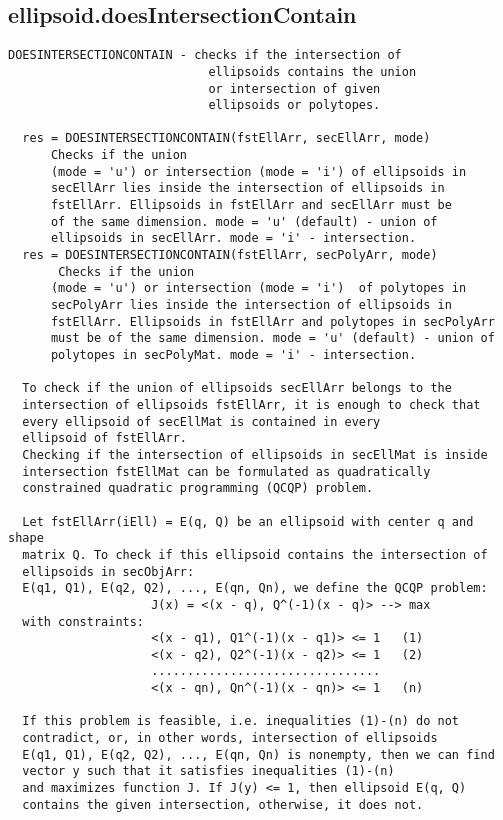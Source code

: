 \subsection{\texorpdfstring{ellipsoid.doesIntersectionContain}{doesIntersectionContain}}\label{method:ellipsoid.doesIntersectionContain}
\begin{verbatim}
DOESINTERSECTIONCONTAIN - checks if the intersection of
                            ellipsoids contains the union
                            or intersection of given
                            ellipsoids or polytopes.

  res = DOESINTERSECTIONCONTAIN(fstEllArr, secEllArr, mode)
      Checks if the union
      (mode = 'u') or intersection (mode = 'i') of ellipsoids in
      secEllArr lies inside the intersection of ellipsoids in
      fstEllArr. Ellipsoids in fstEllArr and secEllArr must be
      of the same dimension. mode = 'u' (default) - union of
      ellipsoids in secEllArr. mode = 'i' - intersection.
  res = DOESINTERSECTIONCONTAIN(fstEllArr, secPolyArr, mode)
       Checks if the union
      (mode = 'u') or intersection (mode = 'i')  of polytopes in
      secPolyArr lies inside the intersection of ellipsoids in
      fstEllArr. Ellipsoids in fstEllArr and polytopes in secPolyArr
      must be of the same dimension. mode = 'u' (default) - union of
      polytopes in secPolyMat. mode = 'i' - intersection.

  To check if the union of ellipsoids secEllArr belongs to the
  intersection of ellipsoids fstEllArr, it is enough to check that
  every ellipsoid of secEllMat is contained in every
  ellipsoid of fstEllArr.
  Checking if the intersection of ellipsoids in secEllMat is inside
  intersection fstEllMat can be formulated as quadratically
  constrained quadratic programming (QCQP) problem.

  Let fstEllArr(iEll) = E(q, Q) be an ellipsoid with center q and shape
  matrix Q. To check if this ellipsoid contains the intersection of
  ellipsoids in secObjArr:
  E(q1, Q1), E(q2, Q2), ..., E(qn, Qn), we define the QCQP problem:
                    J(x) = <(x - q), Q^(-1)(x - q)> --> max
  with constraints:
                    <(x - q1), Q1^(-1)(x - q1)> <= 1   (1)
                    <(x - q2), Q2^(-1)(x - q2)> <= 1   (2)
                    ................................
                    <(x - qn), Qn^(-1)(x - qn)> <= 1   (n)

  If this problem is feasible, i.e. inequalities (1)-(n) do not
  contradict, or, in other words, intersection of ellipsoids
  E(q1, Q1), E(q2, Q2), ..., E(qn, Qn) is nonempty, then we can find
  vector y such that it satisfies inequalities (1)-(n)
  and maximizes function J. If J(y) <= 1, then ellipsoid E(q, Q)
  contains the given intersection, otherwise, it does not.


\end{verbatim}
